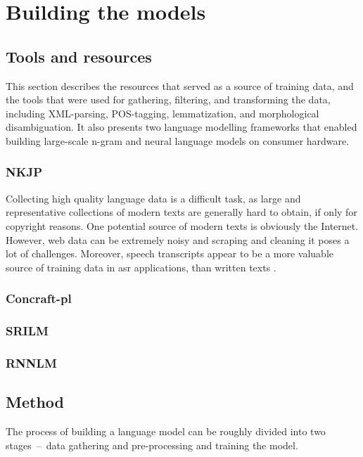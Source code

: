 \chapter{Building the models}
\label{chapter:tools}
\section{Tools and resources}
This section describes the resources that served as a source of training data, and the tools that were used for gathering, filtering, and transforming the data, including XML-parsing, POS-tagging, lemmatization, and morphological disambiguation. It also presents two language modelling frameworks that enabled building large-scale n-gram and neural language models on consumer hardware.
\subsection{NKJP}
\label{section:nkjp}
Collecting high quality language data is a difficult task, as large and representative collections of modern texts are generally hard to obtain, if only for copyright reasons. One potential source of modern texts is obviously the Internet. However, web data can be extremely noisy and scraping and cleaning it poses a lot of challenges. Moreover, speech transcripts appear to be a more valuable source of training data in \gls{asr} applications, than written texts \cite{dziadzio2015comparison}. 
\subsection{Concraft-pl}
\subsection{SRILM}
\subsection{RNNLM}
\section{Method}
The process of building a language model can be roughly divided into two stages~--~data gathering and pre-processing and training the model.
